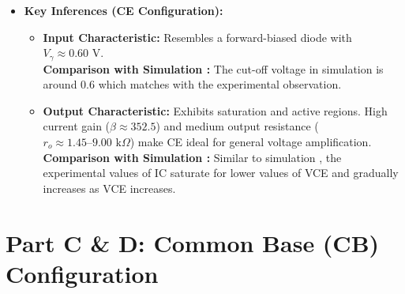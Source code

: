 \documentclass[11pt,a4paper]{article}
\begin{document}
\begin{itemize}
\begin{itemize}
        \[
        \mathbf{\beta = \frac{35.4 - 21.4\text{ mA}}{100 - 60\ \mu\text{A}} = \frac{14.0\text{ mA}}{40\ \mu\text{A}} = 350.00}
        \]
        \item \textbf{Average Measured CE Gain ($\beta_{exp}$):} \textbf{$\beta_{avg} = 352.50$}
    \end{itemize}
    \item \textbf{Key Inferences (CE Configuration):}
    \begin{itemize}
        \item \textbf{Input Characteristic:} Resembles a forward-biased diode with \textbf{$V_\gamma \approx 0.60\text{ V}$}.\\
        \textbf{Comparison with Simulation : } The cut-off voltage in simulation is around 0.6 which matches with the experimental observation.
        \item \textbf{Output Characteristic:} Exhibits saturation and active regions. High current gain (\textbf{$\beta \approx 352.5$}) and medium output resistance (\textbf{$r_o \approx 1.45\text{--}9.00\text{ k}\Omega$}) make CE ideal for general voltage amplification.\\
        \textbf{Comparison with Simulation : } Similar to simulation , the experimental values of IC saturate for lower values of VCE and gradually increases as VCE increases.
    \end{itemize}
\end{itemize}

\clearpage

\section{Part C \& D: Common Base (CB) Configuration}
\end{document}
